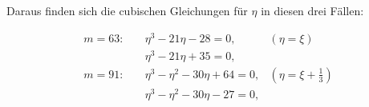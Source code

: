 Daraus finden sich die cubischen Gleichungen für $\eta$ in diesen drei
Fällen:

\[ \begin{aligned}
m = 63:\quad &\eta^3 - 21\eta - 28 = 0, & (\eta = \xi) \\
&\eta^3 - 21\eta + 35 = 0, \\
m = 91:\quad &\eta^3 - \eta^2 - 30\eta + 64 = 0, & (\eta = \xi + \tfrac{1}{3}) \\
&\eta^3 - \eta^2 - 30\eta - 27 = 0,
\end{aligned} \]
